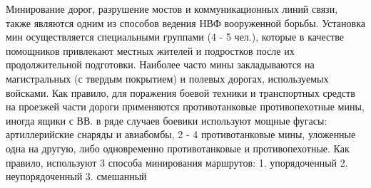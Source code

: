 \documentclass[12pt,a4paper]{report}
\begin{document}
Минирование дорог, разрушение мостов и коммуникационных линий связи, также являются одним из способов ведения НВФ вооруженной борьбы. Установка мин осуществляется специальными группами (4 - 5 чел.), которые в качестве помощников привлекают местных жителей и подростков после их продолжительной подготовки. Наиболее часто мины закладываются на магистральных (с твердым покрытием) и полевых дорогах, используемых войсками. Как правило, для поражения боевой техники и транспортных средств на проезжей части дороги применяются противотанковые противопехотные мины, иногда ящики с ВВ. в ряде случаев боевики используют мощные фугасы: артиллерийские снаряды и авиабомбы, 2 - 4 противотанковые мины, уложенные одна на другую, либо одновременно противотанковые и противопехотные. Как правило, используют 3 способа минирования маршрутов: 
1.	упорядоченный 
2.	неупорядоченный 
3.	смешанный 
\end{document}
